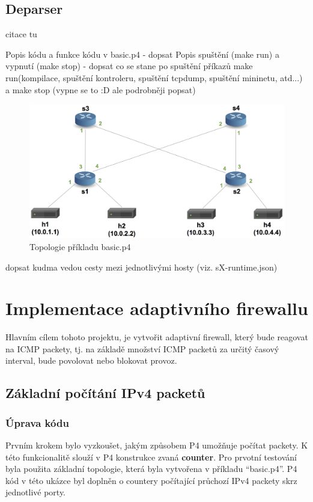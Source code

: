 \documentclass[czech, 11pt]{article}
\begin{document}
    \subsection{Deparser}

    citace tu \cite{p4vm, dokumentace, p4prezentace}
    
    Popis kódu a funkce kódu v basic.p4 - dopsat
    Popis spuštění (make run) a vypnutí (make stop) - dopsat co se stane po spuštění příkazů make run(kompilace, spuštění kontroleru, spuštění tcpdump, spuštění mininetu, atd...) a make stop (vypne se to :D ale podrobněji popsat)
    
    \begin{figure}[H]
		\centering
		\includegraphics[width=\textwidth,height=\textheight,keepaspectratio]{pod-topo.png}
		\caption{Topologie příkladu basic.p4}
		\label{pod_topo}
	\end{figure}

    dopsat kudma vedou cesty mezi jednotlivými hosty (viz. sX-runtime.json)


    \newpage
    \section{Implementace adaptivního firewallu}
    Hlavním cílem tohoto projektu, je vytvořit adaptivní firewall, který bude reagovat na ICMP packety, tj. na základě množství ICMP packetů za určitý časový interval, bude povolovat nebo blokovat provoz.
    \subsection{Základní počítání IPv4 packetů}
    \subsubsection{Úprava kódu}
    Prvním krokem bylo vyzkoušet, jakým způsobem P4 umožňuje počítat packety. K této funkcionalitě slouží v P4 konstrukce zvaná \textbf{counter}. Pro prvotní testování byla použita základní topologie, která byla vytvořena v příkladu \enquote{basic.p4}. P4 kód v této ukázce byl doplněn o countery počítající průchozí IPv4 packety skrz jednotlivé porty.
\end{document}
